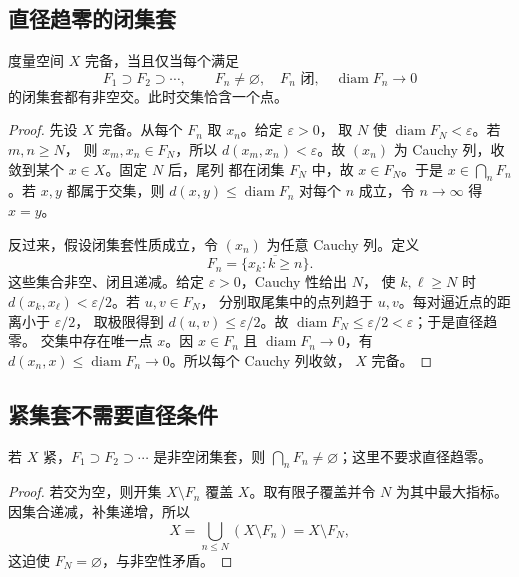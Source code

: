 \subsection{直径趋零的闭集套}

\begin{theorem}
\label{thm:cantor-intersection-complete-metric}
度量空间 \(X\) 完备，当且仅当每个满足
\[
 F_1\supset F_2\supset\cdots,\qquad
 F_n\ne\varnothing,\quad F_n\text{ 闭},\quad
 \operatorname{diam}F_n\to0
\]
的闭集套都有非空交。此时交集恰含一个点。
\end{theorem}

\begin{proof}
先设 \(X\) 完备。从每个 \(F_n\) 取 \(x_n\)。给定 \(\varepsilon>0\)，
取 \(N\) 使 \(\operatorname{diam}F_N<\varepsilon\)。若 \(m,n\ge N\)，
则 \(x_m,x_n\in F_N\)，所以 \(d(x_m,x_n)<\varepsilon\)。故
\((x_n)\) 为 Cauchy 列，收敛到某个 \(x\in X\)。固定 \(N\) 后，尾列
都在闭集 \(F_N\) 中，故 \(x\in F_N\)。于是
\(x\in\bigcap_nF_n\)。若 \(x,y\) 都属于交集，则
\(d(x,y)\le\operatorname{diam}F_n\) 对每个 \(n\) 成立，令 \(n\to\infty\)
得 \(x=y\)。

反过来，假设闭集套性质成立，令 \((x_n)\) 为任意 Cauchy 列。定义
\[
 F_n=\overline{\{x_k:k\ge n\}}.
\]
这些集合非空、闭且递减。给定 \(\varepsilon>0\)，Cauchy 性给出 \(N\)，
使 \(k,\ell\ge N\) 时 \(d(x_k,x_\ell)<\varepsilon/2\)。若 \(u,v\in F_N\)，
分别取尾集中的点列趋于 \(u,v\)。每对逼近点的距离小于 \(\varepsilon/2\)，
取极限得到 \(d(u,v)\le\varepsilon/2\)。故
\(\operatorname{diam}F_N\le\varepsilon/2<\varepsilon\)；于是直径趋零。
交集中存在唯一点 \(x\)。因 \(x\in F_n\) 且
\(\operatorname{diam}F_n\to0\)，有
\(d(x_n,x)\le\operatorname{diam}F_n\to0\)。所以每个 Cauchy 列收敛，
\(X\) 完备。
\end{proof}

\subsection{紧集套不需要直径条件}

\begin{theorem}[紧空间中的闭集套]
\label{thm:nested-closed-compact-metric}
若 \(X\) 紧，\(F_1\supset F_2\supset\cdots\) 是非空闭集套，则
\(\bigcap_nF_n\ne\varnothing\)；这里不要求直径趋零。
\end{theorem}

\begin{proof}
若交为空，则开集 \(X\setminus F_n\) 覆盖 \(X\)。取有限子覆盖并令 \(N\)
为其中最大指标。因集合递减，补集递增，所以
\[
 X=\bigcup_{n\le N}(X\setminus F_n)=X\setminus F_N,
\]
这迫使 \(F_N=\varnothing\)，与非空性矛盾。
\end{proof}

